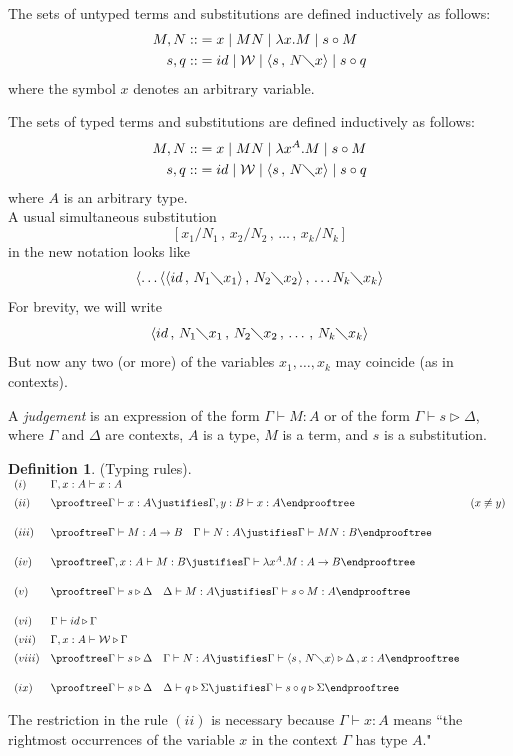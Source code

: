 \documentclass[11pt]{amsart}
\def\ruleone#1#2{\prooftree #1 \justifies #2 \endprooftree}
\def\ruletwo#1#2#3{\ruleone{#1\quad #2}{#3}}
\theoremstyle{plain}
\theoremstyle{definition}
\newtheorem{definition}[theorem]{Definition}
\theoremstyle{remark}
\numberwithin{equation}{section}
\newcommand{\tri}{\triangleright}
\newcommand{\ci}{\circ}
\newcommand{\mi}{\,,\,}
\newcommand{\is}{\diagdown}
\newcommand{\arrow}{\rightarrow}
\newcommand{\la}{\langle}
\newcommand{\ra}{\rangle}
\renewcommand{\pi}{\mathcal{W}}
\begin{document}
 The sets of untyped
terms and substitutions  are defined inductively as follows:
\begin{align*}
M,N::&= x \mid  MN \mid \lambda x. M \mid s\ci M \\
s,q::&= id \mid \pi \mid \langle s\mi  N\is x \rangle \mid s\ci q
\end{align*}
where the symbol $x$ denotes an arbitrary variable.

 The sets of typed
terms and substitutions are defined inductively as follows:
\begin{align*}
M,N::&= x \mid  MN \mid \lambda x^A. M \mid s\ci M \\
s,q::&= id \mid \pi \mid \langle s\mi  N\is x \rangle \mid s\ci q
\end{align*}
where $A$ is an arbitrary type.\\
A usual simultaneous substitution $$[x_1/N_1\mi
x_2/N_2\mi\ldots\mi x_k/N_k]$$ in the new notation looks like
$$\la\ldots\la\la id\mi N_1\is x_1\ra\mi N_2\is x_2\ra\mi\ldots
N_k\is x_k\ra$$ For brevity, we will write  $$\la id\mi N_1\is
x_1\mi N_2\is x_2\mi\ldots\mi N_k\is x_k\ra$$ But now any two (or
more) of the variables $x_1,\ldots,x_k$
 may
coincide (as in contexts).

A \emph{judgement} is an expression of the form $\Gamma\vdash M:A$
or of the form $\Gamma\vdash s\tri\Delta$, where $\Gamma$ and
$\Delta$ are contexts, $A$ is a type, $M$ is a term, and $s$ is a
substitution.
\begin{definition} (Typing rules).\label{type}\\
$
\begin{array}{lll}
(i)& \Gamma,x:A\vdash x:A &\\[5pt]
(ii)& \ruleone{\Gamma\vdash
x:A}{\Gamma,y:B\vdash x:A} & (x\not\equiv y) \\[15pt]
(iii)& \ruletwo{\Gamma\vdash M:A\arrow B}{\Gamma\vdash
N:A}{\Gamma\vdash
MN:B} &\\[15pt]
(iv)& \ruleone{\Gamma,x:A\vdash M:B}{\Gamma\vdash\lambda x^A.M:A\arrow B} &\\[15pt]
(v)& \ruletwo{\Gamma\vdash s\tri\Delta}{\Delta\vdash
M:A}{\Gamma\vdash
 s\ci M:A} &\\[15pt]
(vi)& \Gamma\vdash id\tri\Gamma &\\[5pt]
(vii)& \Gamma,x:A\vdash\pi \tri\Gamma &\\[5pt]
(viii)& \ruletwo{\Gamma\vdash s\tri\Delta}{\Gamma\vdash
N:A}{\Gamma\vdash
\langle s\mi N\is x\rangle\tri\Delta\, ,x:A} &\\[15pt]
(ix)& \ruletwo{\Gamma\vdash s\tri\Delta}{\Delta\vdash
q\tri\Sigma}{\Gamma\vdash s\ci q\tri\Sigma} &
\end{array}
$\\[5pt]
\end{definition}
The restriction in the rule $(ii)$ is necessary  because
$\Gamma\vdash x:A$ means ``the rightmost occurrences of the
variable $x$ in the context $\Gamma$ has type $A$."
\end{document}
